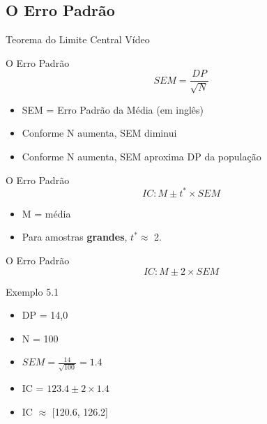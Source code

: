 \documentclass{beamer}
\begin{document}
\subsection{O Erro Padrão}

\begin{frame}{Teorema do Limite Central}
  Vídeo
\end{frame}

\begin{frame}{O Erro Padrão}
  \begin{displaymath}
    SEM = \frac{DP}{\sqrt{N}}
  \end{displaymath}
  \begin{itemize}
  \item SEM = Erro Padrão da Média (em inglês)
  \item Conforme N aumenta, SEM diminui
  \item Conforme N aumenta, SEM aproxima DP da população
  \end{itemize}
\end{frame}

\begin{frame}{O Erro Padrão}
  \begin{displaymath}
    IC: M \pm t^{*} \times SEM
  \end{displaymath}
  \begin{itemize}
  \item M = média
  \item Para amostras {\bf grandes}, $t^{*} \approx$ 2.
  \end{itemize}
\end{frame}

\begin{frame}{O Erro Padrão}
  \begin{displaymath}
    IC: M \pm 2 \times SEM
  \end{displaymath}
  \begin{exampleblock}{Exemplo 5.1}
    \begin{itemize}
    \item DP = 14,0
    \item N = 100
    \item $SEM = \frac{14}{\sqrt{100}} = 1.4$
    \item IC =  $123.4 \pm 2 \times 1.4$
    \item IC $\approx$ [120.6, 126.2]
    \end{itemize}
  \end{exampleblock}
\end{frame}
\end{document}

